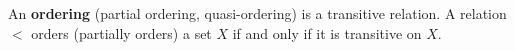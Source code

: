 An \textbf{ordering} (partial ordering, quasi-ordering) is a transitive relation. A relation $<$ orders (partially orders) a set $X$ if and only if it is transitive on $X$.
